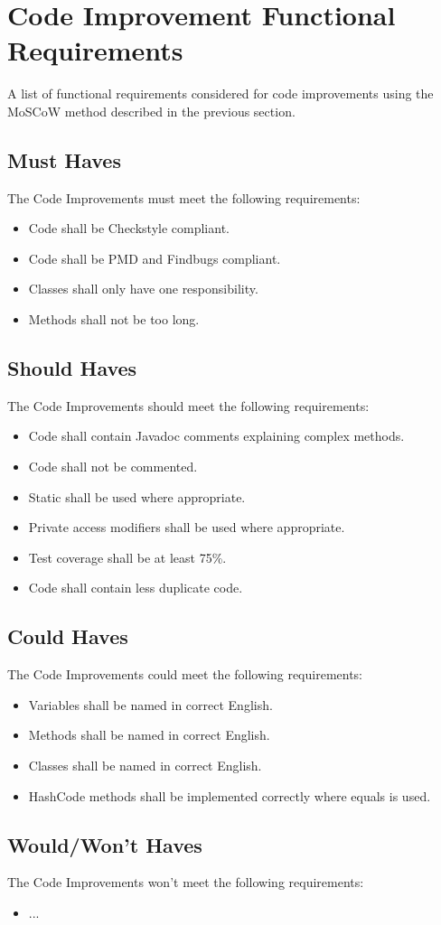 \documentclass[10pt]{article}
\begin{document}
\section*{Code Improvement Functional Requirements}

A list of functional requirements considered for code improvements using the MoSCoW method described in the previous section.

\subsection*{Must Haves}
The Code Improvements must meet the following requirements:
\begin{itemize}
	\item Code shall be Checkstyle compliant.
	\item Code shall be PMD and Findbugs compliant.
	\item Classes shall only have one responsibility.
	\item Methods shall not be too long.
\end{itemize}

\subsection*{Should Haves}
The Code Improvements should meet the following requirements:
\begin{itemize}
	\item Code shall contain Javadoc comments explaining complex methods.
	\item Code shall not be commented.
	\item Static shall be used where appropriate.
	\item Private access modifiers shall be used where appropriate.
	\item Test coverage shall be at least 75\%.
	\item Code shall contain less duplicate code.
\end{itemize}

\subsection*{Could Haves}
The Code Improvements could meet the following requirements:
\begin{itemize}
	\item Variables shall be named in correct English.
	\item Methods shall be named in correct English.
	\item Classes shall be named in correct English.
	\item HashCode methods shall be implemented correctly where equals is used.
\end{itemize}

\subsection*{Would/Won't Haves}
The Code Improvements won't meet the following requirements:
\begin{itemize}
	\item ...
\end{itemize}
\newpage

\end{document}
